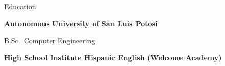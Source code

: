 \begin{rubric}{Education}

%

\entry*[2015 -- currently]%
	\textbf{Autonomous University of San Luis Potosí   }\par
	B.Sc.~Computer Engineering

\entry*[2012 -- 2015]%
	\textbf{High School Institute Hispanic English (Welcome Academy)}\par
\end{rubric}